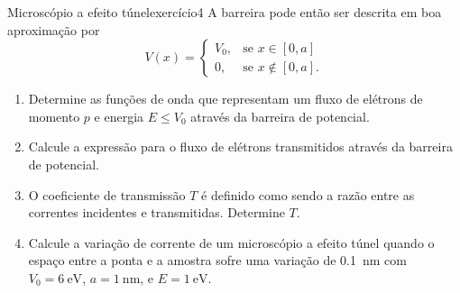 \begin{exercício}{Microscópio a efeito túnel}{exercício4}
    A barreira pode então ser descrita em boa aproximação por
    \begin{equation*}
        V(x) = \begin{cases}
            V_0,&\text{se }x \in [0,a]\\
            0,&\text{se }x \notin[0,a].
        \end{cases}
    \end{equation*}
    \begin{enumerate}[label=(\alph*)]
        \item Determine as funções de onda que representam um fluxo de elétrons de momento \(p\) e energia \(E \leq V_0\) através da barreira de potencial.
        \item Calcule a expressão para o fluxo de elétrons transmitidos através da barreira de potencial.
        \item O coeficiente de transmissão \(T\) é definido como sendo a razão entre as correntes incidentes e transmitidas. Determine \(T\).
        \item Calcule a variação de corrente de um microscópio a efeito túnel quando o espaço entre a ponta e a amostra sofre uma variação de \SI{0.1}{\nano\meter} com \(V_0 = \SI{6}{\eV}\), \(a = \SI{1}{\nano\meter}\), e \(E = \SI{1}{\eV}\).
    \end{enumerate}
\end{exercício}
